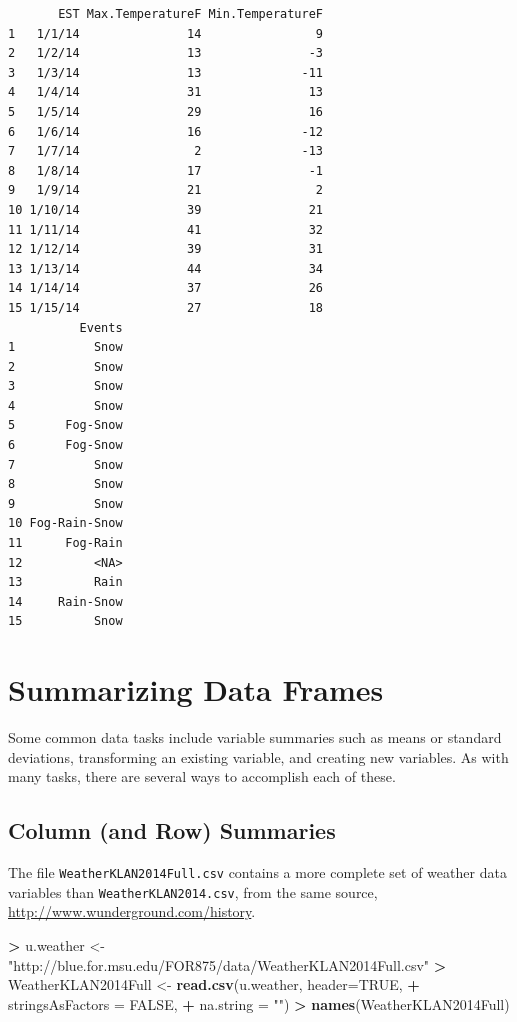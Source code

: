 \documentclass[]{krantz}
\makeatletter
\newenvironment{Shaded}{\begin{snugshade}}{\end{snugshade}}
\newcommand{\KeywordTok}[1]{\textcolor[rgb]{0.27,0.27,0.27}{\textbf{#1}}}
\newcommand{\DataTypeTok}[1]{\textcolor[rgb]{0.27,0.27,0.27}{#1}}
\newcommand{\StringTok}[1]{\textcolor[rgb]{0.5,0.5,0.5}{#1}}
\newcommand{\OtherTok}[1]{\textcolor[rgb]{0.37,0.37,0.37}{#1}}
\newcommand{\OperatorTok}[1]{\textcolor[rgb]{0.43,0.43,0.43}{\textbf{#1}}}
\newcommand{\NormalTok}[1]{#1}
\newenvironment{kframe}{%
\medskip{}
\setlength{\fboxsep}{.8em}
 \def\at@end@of@kframe{}%
 \ifinner\ifhmode%
  \def\at@end@of@kframe{\end{minipage}}%
  \begin{minipage}{\columnwidth}%
 \fi\fi%
 \def\FrameCommand##1{\hskip\@totalleftmargin \hskip-\fboxsep
 \colorbox{shadecolor}{##1}\hskip-\fboxsep
     \hskip-\linewidth \hskip-\@totalleftmargin \hskip\columnwidth}%
 \MakeFramed {\advance\hsize-\width
   \@totalleftmargin\z@ \linewidth\hsize
   \@setminipage}}%
 {\par\unskip\endMakeFramed%
 \at@end@of@kframe}
\renewenvironment{Shaded}{\begin{kframe}}{\end{kframe}}
\makeatother
\begin{document}
\begin{verbatim}
       EST Max.TemperatureF Min.TemperatureF
1   1/1/14               14                9
2   1/2/14               13               -3
3   1/3/14               13              -11
4   1/4/14               31               13
5   1/5/14               29               16
6   1/6/14               16              -12
7   1/7/14                2              -13
8   1/8/14               17               -1
9   1/9/14               21                2
10 1/10/14               39               21
11 1/11/14               41               32
12 1/12/14               39               31
13 1/13/14               44               34
14 1/14/14               37               26
15 1/15/14               27               18
          Events
1           Snow
2           Snow
3           Snow
4           Snow
5       Fog-Snow
6       Fog-Snow
7           Snow
8           Snow
9           Snow
10 Fog-Rain-Snow
11      Fog-Rain
12          <NA>
13          Rain
14     Rain-Snow
15          Snow
\end{verbatim}

\section{Summarizing Data Frames}\label{summarizing-data-frames}

Some common data tasks include variable summaries such as means or
standard deviations, transforming an existing variable, and creating new
variables. As with many tasks, there are several ways to accomplish each
of these.

\subsection{Column (and Row) Summaries}\label{column-and-row-summaries}

The file \texttt{WeatherKLAN2014Full.csv} contains a more complete set
of weather data variables than \texttt{WeatherKLAN2014.csv}, from the
same source, \url{http://www.wunderground.com/history}.

\begin{Shaded}
\begin{Highlighting}[]
\OperatorTok{>}\StringTok{ }\NormalTok{u.weather <-}\StringTok{ "http://blue.for.msu.edu/FOR875/data/WeatherKLAN2014Full.csv"}
\OperatorTok{>}\StringTok{ }\NormalTok{WeatherKLAN2014Full <-}\StringTok{ }\KeywordTok{read.csv}\NormalTok{(u.weather, }\DataTypeTok{header=}\OtherTok{TRUE}\NormalTok{, }
\OperatorTok{+}\StringTok{                                }\DataTypeTok{stringsAsFactors =} \OtherTok{FALSE}\NormalTok{, }
\OperatorTok{+}\StringTok{                                }\DataTypeTok{na.string =} \StringTok{""}\NormalTok{)}
\OperatorTok{>}\StringTok{ }\KeywordTok{names}\NormalTok{(WeatherKLAN2014Full)}
\end{Highlighting}
\end{Shaded}
\end{document}
